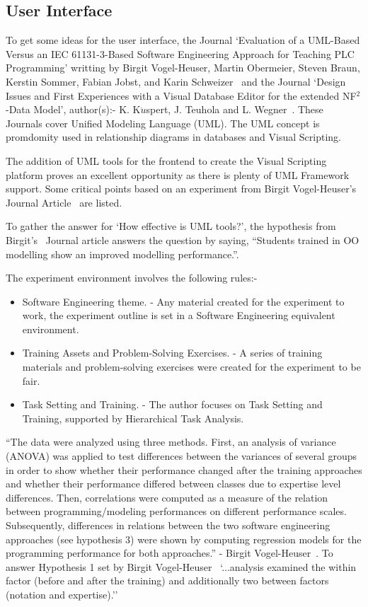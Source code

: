 \documentclass[12pt]{report} %
\begin{document}
		\subsection{User Interface}
		\label{subsec:userInterface}
			To get some ideas for the user interface, the Journal `Evaluation of a UML-Based Versus an IEC 61131-3-Based Software Engineering Approach for Teaching PLC Programming' writting by Birgit Vogel-Heuser, Martin Obermeier, Steven Braun, Kerstin Sommer, Fabian Jobst, and Karin Schweizer~\cite{vogel-heuser_evaluation_2013} and the Journal `Design Issues and First Experiences with a Visual Database Editor for the extended NF$^{2}$-Data Model', author(s):- K. K${\ddot{u}}$spert, J. Teuhola and L. Wegner~\cite{kuspert_design_1990}. These Journals cover Unified Modeling Language (UML). The UML concept is promdomity used in relationship diagrams in databases and Visual Scripting. 

			The addition of UML tools for the frontend to create the Visual Scripting platform proves an excellent opportunity as there is plenty of UML Framework support. Some critical points based on an experiment from Birgit Vogel-Heuser's Journal Article~\cite{vogel-heuser_evaluation_2013} are listed.

			To gather the answer for `How effective is UML tools?', the hypothesis from Birgit's~\cite{vogel-heuser_evaluation_2013} Journal article answers the question by saying, ``Students trained in OO modelling show an improved modelling performance.''. 
		
			The experiment environment involves the following rules:-
			\begin{itemize}
			\item Software Engineering theme. - Any material created for the experiment to work, the experiment outline is set in a Software Engineering equivalent environment.
			\item Training Assets and Problem-Solving Exercises. - A series of training materials and problem-solving exercises were created for the experiment to be fair.
			\item Task Setting and Training. - The author focuses on Task Setting and Training, supported by Hierarchical Task Analysis.
			\end{itemize}

			``The data were analyzed using three methods. First, an analysis of variance (ANOVA) was applied to test differences between the variances of several groups in order to show whether their performance changed after the training approaches and whether their performance differed between classes due to expertise level differences. Then, correlations were computed as a measure of the relation between programming/modeling performances on different performance scales. Subsequently, differences in relations between the two software engineering approaches (see hypothesis 3) were shown by computing regression models for the programming performance for both approaches.'' - Birgit Vogel-Heuser~\cite{vogel-heuser_evaluation_2013}. To answer Hypothesis 1 set by Birgit Vogel-Heuser~\cite{vogel-heuser_evaluation_2013} `...analysis examined the within factor (before and after the training) and additionally two between factors (notation and expertise).''
\end{document}
